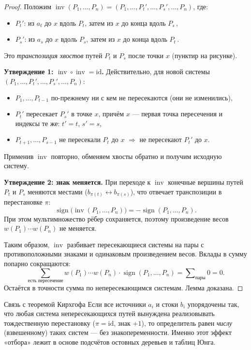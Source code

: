 \begin{proof}
	Положим $\operatorname{inv}(P_1,\ldots,P_n) = (P_1,\ldots,P_t',\ldots,P_s',\ldots,P_n)$, где:
	\begin{itemize}
		\item $P_t'$: из $a_t$ до $x$ вдоль $P_t$, затем из $x$ до конца вдоль $P_s$\,,
		\item $P_s'$: из $a_s$ до $x$ вдоль $P_s$, затем из $x$ до конца вдоль $P_t$\,.
	\end{itemize}
	Это \emph{транспозиция хвостов} путей $P_t$ и $P_s$ после точки $x$ (пунктир на рисунке).

	\medskip
	\textbf{Утверждение 1: $\operatorname{inv}\circ\operatorname{inv} = \mathrm{id}$.}
	Действительно, для новой системы $(P_1,\ldots,P_t',\ldots,P_s',\ldots,P_n)$:
	\begin{itemize}
		\item $P_1,\ldots,P_{t-1}$ по-прежнему ни с кем не пересекаются (они не изменились),
		\item $P_t'$ пересекает $P_s'$ в точке $x$, причём $x$ — первая точка пересечения и индексы те же: $t' = t$, $s' = s$,
		\item $P_{t+1},\ldots,P_{s-1}$ не пересекали $P_t$ до $x$ $\Rightarrow$ не пересекают $P_t'$ до $x$.
	\end{itemize}
	Применив $\operatorname{inv}$ повторно, обменяем хвосты обратно и получим исходную систему.

	\medskip
	\textbf{Утверждение 2: знак меняется.}
	При переходе к $\operatorname{inv}$ конечные вершины путей $P_t$ и $P_s$ меняются местами
	($b_{\pi(t)} \leftrightarrow b_{\pi(s)}$), что отвечает транспозиции в перестановке $\pi$:
	\[
	\operatorname{sign}\!\bigl(\operatorname{inv}(P_1,\ldots,P_n)\bigr) = -\operatorname{sign}(P_1,\ldots,P_n).
	\]
	При этом мультимножество рёбер сохраняется, поэтому произведение весов $w(P_1)\cdots w(P_n)$ не меняется.

	Таким образом, $\operatorname{inv}$ разбивает пересекающиеся системы на пары с противоположными
	знаками и одинаковым произведением весов. Вклады в сумму попарно сокращаются:
	\[
	\sum_{\text{есть пересечение}}
	w(P_1)\cdots w(P_n)\cdot\operatorname{sign}(P_1,\ldots,P_n) = \sum\nolimits_{\text{пары}} 0 = 0.
	\]
	Остаётся в точности сумма по непересекающимся системам. Лемма доказана.
\end{proof}

\begin{Remark}{Связь с теоремой Кирхгофа}{}
	Если все источники $a_i$ и стоки $b_i$ упорядочены так, что любая система непересекающихся путей вынуждена реализовывать тождественную перестановку ($\pi=\mathrm{id}$, знак $+1$), то определитель равен \emph{числу} (взвешенному) таких систем — без знакопеременности. Именно этот эффект «отбора» лежит в основе подсчётов остовных деревьев и таблиц Юнга.
\end{Remark}
